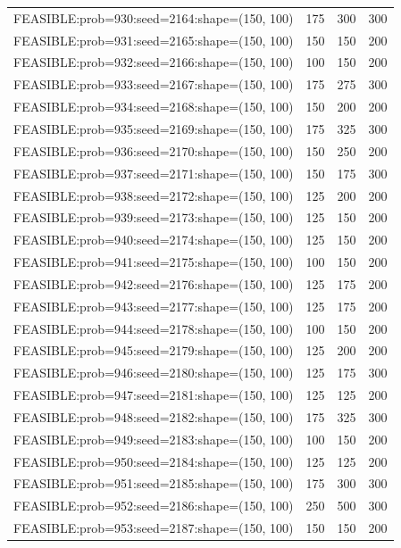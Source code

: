 \begin{longtable}{lccc}
FEASIBLE:prob=930:seed=2164:shape=(150, 100) &  175 &   300 &    300 \\
FEASIBLE:prob=931:seed=2165:shape=(150, 100) &  150 &   150 &    200 \\
FEASIBLE:prob=932:seed=2166:shape=(150, 100) &  100 &   150 &    200 \\
FEASIBLE:prob=933:seed=2167:shape=(150, 100) &  175 &   275 &    300 \\
FEASIBLE:prob=934:seed=2168:shape=(150, 100) &  150 &   200 &    200 \\
FEASIBLE:prob=935:seed=2169:shape=(150, 100) &  175 &   325 &    300 \\
FEASIBLE:prob=936:seed=2170:shape=(150, 100) &  150 &   250 &    200 \\
FEASIBLE:prob=937:seed=2171:shape=(150, 100) &  150 &   175 &    300 \\
FEASIBLE:prob=938:seed=2172:shape=(150, 100) &  125 &   200 &    200 \\
FEASIBLE:prob=939:seed=2173:shape=(150, 100) &  125 &   150 &    200 \\
FEASIBLE:prob=940:seed=2174:shape=(150, 100) &  125 &   150 &    200 \\
FEASIBLE:prob=941:seed=2175:shape=(150, 100) &  100 &   150 &    200 \\
FEASIBLE:prob=942:seed=2176:shape=(150, 100) &  125 &   175 &    200 \\
FEASIBLE:prob=943:seed=2177:shape=(150, 100) &  125 &   175 &    200 \\
FEASIBLE:prob=944:seed=2178:shape=(150, 100) &  100 &   150 &    200 \\
FEASIBLE:prob=945:seed=2179:shape=(150, 100) &  125 &   200 &    200 \\
FEASIBLE:prob=946:seed=2180:shape=(150, 100) &  125 &   175 &    300 \\
FEASIBLE:prob=947:seed=2181:shape=(150, 100) &  125 &   125 &    200 \\
FEASIBLE:prob=948:seed=2182:shape=(150, 100) &  175 &   325 &    300 \\
FEASIBLE:prob=949:seed=2183:shape=(150, 100) &  100 &   150 &    200 \\
FEASIBLE:prob=950:seed=2184:shape=(150, 100) &  125 &   125 &    200 \\
FEASIBLE:prob=951:seed=2185:shape=(150, 100) &  175 &   300 &    300 \\
FEASIBLE:prob=952:seed=2186:shape=(150, 100) &  250 &   500 &    300 \\
FEASIBLE:prob=953:seed=2187:shape=(150, 100) &  150 &   150 &    200 \\

\end{longtable}
